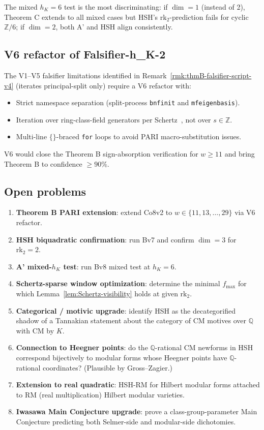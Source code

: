 \documentclass[11pt,a4paper]{amsart}
\theoremstyle{definition}
\newcommand{\Q}{\mathbb{Q}}
\newcommand{\Z}{\mathbb{Z}}
\newcommand{\hK}{h_{K}}
\newcommand{\rktwo}{\mathrm{rk}_2}
\begin{document}
The mixed $\hK = 6$ test is the most discriminating: if $\dim = 1$ (instead of 2), Theorem C extends to all mixed cases but HSH's $\rktwo$-prediction fails for cyclic $\Z/6$; if $\dim = 2$, both A' and HSH align consistently.

\subsection{V6 refactor of Falsifier-h\_K-2}\label{sec:V6-refactor}

The V1--V5 falsifier limitations identified in Remark~\ref{rmk:thmB-falsifier-script-v4} (iterates principal-split only) require a V6 refactor with:
\begin{itemize}[leftmargin=2em]
  \item Strict namespace separation (split-process \texttt{bnfinit} and \texttt{mfeigenbasis}).
  \item Iteration over ring-class-field generators per Schertz~\cite[\S6]{Schertz2010}, not over $s \in \Z$.
  \item Multi-line $\{\}$-braced \texttt{for} loops to avoid PARI macro-substitution issues.
\end{itemize}

V6 would close the Theorem B sign-absorption verification for $w \ge 11$ and bring Theorem B to confidence $\ge 90\%$.

\subsection{Open problems}\label{sec:open-problems-v4}

\begin{enumerate}[leftmargin=2em]
  \item \textbf{Theorem B PARI extension}: extend Co8v2 to $w \in \{11, 13, \ldots, 29\}$ via V6 refactor.
  \item \textbf{HSH biquadratic confirmation}: run Bv7 and confirm $\dim = 3$ for $\rktwo = 2$.
  \item \textbf{A' mixed-$\hK$ test}: run Bv8 mixed test at $\hK = 6$.
  \item \textbf{Schertz-sparse window optimization}: determine the minimal $f_{\max}$ for which Lemma~\ref{lem:Schertz-visibility} holds at given $\rktwo$.
  \item \textbf{Categorical / motivic upgrade}: identify HSH as the decategorified shadow of a Tannakian statement about the category of CM motives over $\Q$ with CM by $K$.
  \item \textbf{Connection to Heegner points}: do the $\Q$-rational CM newforms in HSH correspond bijectively to modular forms whose Heegner points have $\Q$-rational coordinates? (Plausible by Gross--Zagier.)
  \item \textbf{Extension to real quadratic}: HSH-RM for Hilbert modular forms attached to RM (real multiplication) Hilbert modular varieties.
  \item \textbf{Iwasawa Main Conjecture upgrade}: prove a class-group-parameter Main Conjecture predicting both Selmer-side and modular-side dichotomies.
\end{enumerate}
\end{document}
